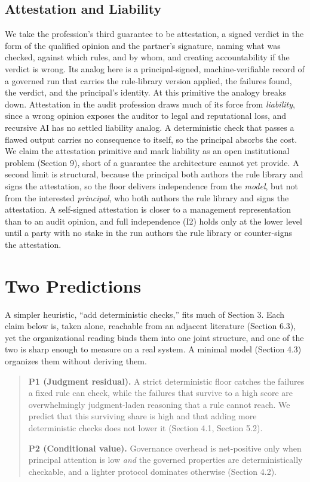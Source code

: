 \documentclass[11pt]{article}
\begin{document}
\subsection{Attestation and Liability}

We take the profession's third guarantee to be attestation, a signed verdict in the form of the qualified opinion and the partner's signature, naming what was checked, against which rules, and by whom, and creating accountability if the verdict is wrong. Its analog here is a principal-signed, machine-verifiable record of a governed run that carries the rule-library version applied, the failures found, the verdict, and the principal's identity. At this primitive the analogy breaks down. Attestation in the audit profession draws much of its force from \emph{liability}, since a wrong opinion exposes the auditor to legal and reputational loss, and recursive AI has no settled liability analog. A deterministic check that passes a flawed output carries no consequence to itself, so the principal absorbs the cost. We claim the attestation primitive and mark liability as an open institutional problem (Section 9), short of a guarantee the architecture cannot yet provide. A second limit is structural, because the principal both authors the rule library and signs the attestation, so the floor delivers independence from the \emph{model}, but not from the interested \emph{principal}, who both authors the rule library and signs the attestation. A self-signed attestation is closer to a management representation than to an audit opinion, and full independence (I2) holds only at the lower level until a party with no stake in the run authors the rule library or counter-signs the attestation.

\section{Two Predictions}

A simpler heuristic, ``add deterministic checks,'' fits much of Section 3. Each claim below is, taken alone, reachable from an adjacent literature (Section 6.3), yet the organizational reading binds them into one joint structure, and one of the two is sharp enough to measure on a real system. A minimal model (Section 4.3) organizes them without deriving them.

\begin{quote}
\textbf{P1 (Judgment residual).} A strict deterministic floor catches the failures a fixed rule can check, while the failures that survive to a high score are overwhelmingly judgment-laden reasoning that a rule cannot reach. We predict that this surviving share is high and that adding more deterministic checks does not lower it (Section 4.1, Section 5.2).

\textbf{P2 (Conditional value).} Governance overhead is net-positive only when principal attention is low \emph{and} the governed properties are deterministically checkable, and a lighter protocol dominates otherwise (Section 4.2).
\end{quote}
\end{document}
